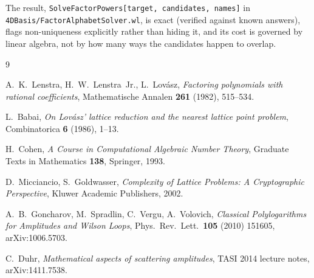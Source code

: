 \documentclass[11pt]{article}
\newcommand{\code}[1]{\texttt{#1}}
\begin{document}
\noindent The result, \code{SolveFactorPowers[target, candidates, names]} in \code{4DBasis/FactorAlphabetSolver.wl}, is exact (verified against known answers), flags non-uniqueness explicitly rather than hiding it, and its cost is governed by linear algebra, not by how many ways the candidates happen to overlap.

\begin{thebibliography}{9}

A.~K.~Lenstra, H.~W.~Lenstra~Jr., L.~Lov\'asz,
\textit{Factoring polynomials with rational coefficients},
Mathematische Annalen \textbf{261} (1982), 515--534.

L.~Babai,
\textit{On Lov\'asz' lattice reduction and the nearest lattice point problem},
Combinatorica \textbf{6} (1986), 1--13.

H.~Cohen,
\textit{A Course in Computational Algebraic Number Theory},
Graduate Texts in Mathematics \textbf{138}, Springer, 1993.

D.~Micciancio, S.~Goldwasser,
\textit{Complexity of Lattice Problems: A Cryptographic Perspective},
Kluwer Academic Publishers, 2002.

A.~B.~Goncharov, M.~Spradlin, C.~Vergu, A.~Volovich,
\textit{Classical Polylogarithms for Amplitudes and Wilson Loops},
Phys.\ Rev.\ Lett.\ \textbf{105} (2010) 151605,
arXiv:1006.5703.

C.~Duhr,
\textit{Mathematical aspects of scattering amplitudes},
TASI 2014 lecture notes, arXiv:1411.7538.

\end{thebibliography}
\end{document}
